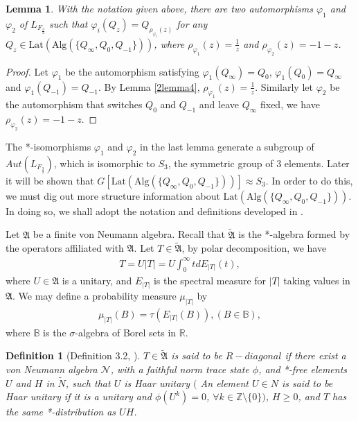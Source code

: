 \documentclass{amsart}
\newcommand{\AAA}{\mathfrak A}
\newcommand{\Lat}{\mathrm{Lat}}
\newcommand{\Alg}{\mathrm{Alg}}
\newcommand{\R}{\mathbb R}  %
\newcommand{\Z}{\mathbb Z} %
\newtheorem{lemma}{Lemma}[section]
\newtheorem{df}{Definition}[section]
\begin{document}
\begin{lemma}\label{3lemma1}
With the notation given above, there are two  automorphisms $\varphi_{1}$ and $\varphi_2$ of $L_{F_{\frac{3}{2}}}$ such that 
$\varphi_{i}(Q_{z}) = Q_{\rho_{\varphi_i}(z)}$ for any $Q_{z} \in \Lat(\Alg( \{ Q_{\infty},  Q_{0}, Q_{-1}\}))$, where $\rho_{\varphi_1}(z) = \frac{1}{z}$ and  $\rho_{\varphi_2}(z) = -1 - z$. 
\end{lemma}
\begin{proof}
Let $\varphi_{1}$ be the automorphism satisfying $\varphi_{1}(Q_{\infty}) = Q_{0}$, $\varphi_{1}(Q_{0}) = Q_{\infty}$ and  $\varphi_{1}(Q_{-1}) = Q_{-1}$.
By Lemma \ref{2lemma4}, $\rho_{\varphi_{1}}(z) = \frac{1}{z}$. Similarly let $\varphi_{2}$ be the automorphism that switches $Q_{0}$ and $Q_{-1}$ and 
leave $Q_{\infty}$ fixed, we have $\rho_{\varphi_{2}}(z) = -1 -z$.
\end{proof}

The *-isomorphisms $\varphi_1$ and $\varphi_2$ in the last lemma generate a subgroup of $Aut( L_{F_{\frac{3}{2}}})$, which is isomorphic to $S_3$, the symmetric group of 3 elements.
Later it will be shown that $G[\Lat(\Alg( \{ Q_{\infty},  Q_{0}, Q_{-1} \}))] \approx S_3$. In order to do this, we must dig out more structure information about $\Lat(\Alg( \{ Q_{\infty},  Q_{0}, Q_{-1}\})) $. 
In doing so, we shall adopt the notation and definitions developed in \cite{HH, VDN, NS}. 

Let $\AAA$ be a finite von Neumann algebra. Recall that $\widetilde{\AAA}$ is the *-algebra formed 
by the operators affiliated with $\AAA$.
Let $T \in \widetilde{\AAA}$, by polar decomposition, we have 
\begin{align*}
T = U|T| = U\int^{\infty}_{0} t dE_{|T|}(t),
\end{align*}
where $U \in \AAA$ is a unitary, and $E_{|T|}$ is the spectral measure for $|T|$ taking values in $\AAA$. 
We may define a probability measure $\mu_{|T|}$ by 
\begin{align*}
\mu_{|T|}(B) = \tau(E_{|T|}(B)),  (B \in \mathbb{B}),
\end{align*}
where $\mathbb{B}$ is the $\sigma$-algebra of Borel sets in $\R$. 

\begin{df}[Definition 3.2, \cite{HH}]
$T \in \widetilde{\AAA}$ is said to be $R-diagonal$ if there exist a von Neumann algebra $\mathcal{N}$, with a 
faithful norm trace state $\phi$, and *-free elements $U$ and $H$ in $\widetilde{N}$, such that $U$ is Haar unitary $($ An element $U \in N$ is said to be Haar unitary 
if it is a unitary and $\phi(U^k) = 0$, $\forall k \in \Z \setminus \{0\})$, $H \geq 0$, and 
$T$ has the same *-distribution as $UH$.
\end{df}
\end{document}
